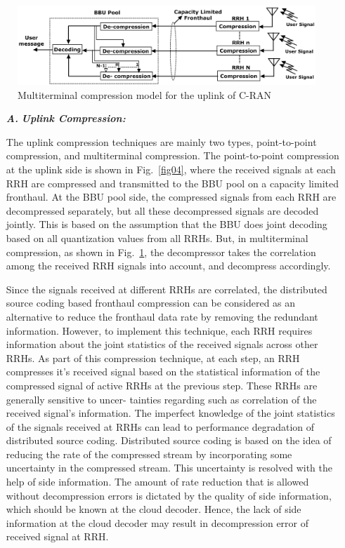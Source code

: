 \begin{figure}[H]
\centering
\includegraphics[scale=.56]{src/Figures/chap3/fig05.jpg}
\caption{Multiterminal compression model for the uplink of C-RAN}\label{fig05}
\end{figure}


\begin{multicols}{2}
\begin{itemize}

\item[{\textit{\textbf{ A.}}}] {\textit{\textbf{Uplink Compression:}}}

The uplink compression techniques are mainly two types, point-to-point compression, and multiterminal compression. The point-to-point compression at the uplink side is shown in Fig.~\ref{fig04}, where the received signals at each RRH are compressed and transmitted to the BBU pool on a capacity limited fronthaul. At the BBU pool side, the compressed signals from each RRH are decompressed separately, but all these decompressed signals are decoded jointly. This is based on the assumption that the BBU does joint decoding based on all quantization values from all RRHs. But, in multiterminal compression, as shown in Fig.~\ref{fig05}, the decompressor takes the correlation among the received RRH signals into account, and decompress accordingly.

Since the signals received at different RRHs are correlated, the distributed source coding based fronthaul compression can be considered as an alternative to reduce the fronthaul data rate by removing the redundant information. However, to implement this technique, each RRH requires information about the joint statistics of the received signals across other RRHs. As part of this compression technique, at each step, an RRH compresses it’s received signal based on the statistical information of the compressed signal of active RRHs at the previous step. These RRHs are generally sensitive to uncer- tainties regarding such as correlation of the received signal’s information. The imperfect knowledge of the joint statistics of the signals received at RRHs can lead to performance degradation of distributed source coding. Distributed source coding is based on the idea of reducing the rate of the compressed stream by incorporating some uncertainty in the compressed stream. This uncertainty is resolved with the help of side information. The amount of rate reduction that is allowed without decompression errors is dictated by the quality of side information, which should be known at the cloud decoder. Hence, the lack of side information at the cloud decoder may result in decompression error of received signal at RRH.


\end{itemize}
\end{multicols}

